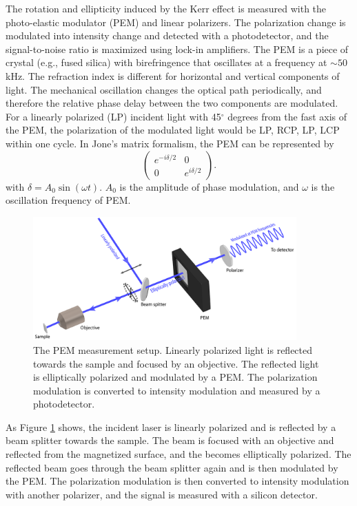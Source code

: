 \documentclass[pdflatex, sectionletters, 12pt]{pittetd}    %
\begin{document}
The rotation and ellipticity induced by the Kerr effect is measured with the photo-elastic modulator (PEM) and linear polarizers. The polarization change is modulated into intensity change and detected with a photodetector, and the signal-to-noise ratio is maximized using lock-in amplifiers. The PEM is a piece of crystal (e.g., fused silica) with birefringence that oscillates at a frequency at $\sim 50$ kHz. The refraction index is different for horizontal and vertical components of light. The mechanical oscillation changes the optical path periodically, and therefore the relative phase delay between the two components are modulated. For a linearly polarized (LP) incident light with 45$^{\circ}$ degrees from the fast axis of the PEM, the polarization of the modulated light would be LP, RCP, LP, LCP within one cycle. In Jone's matrix formalism, the PEM can be represented by
$$
\begin{pmatrix}
e^{-i\delta/2} & 0 \\
0 & e^{i\delta/2}
\end{pmatrix}.
$$ 
with $\delta = A_0 \sin (\omega t)$. $A_0$ is the amplitude of phase modulation, and $\omega$ is the oscillation frequency of PEM.

\begin{figure}[h!]
	\centering
	\includegraphics[width=0.9\textwidth]{Drawing/PEMOptics_small.png}
	\caption{The PEM measurement setup. Linearly polarized light is reflected towards the sample and focused by an objective. The reflected light is elliptically polarized and modulated by a PEM. The polarization modulation is converted to intensity modulation and measured by a photodetector.}
	\label{FIG:PEMOptics}
\end{figure}

As Figure \ref{FIG:PEMOptics} shows, the incident laser is linearly polarized and is reflected by a beam splitter towards the sample. The beam is focused with an objective and reflected from the magnetized surface, and the becomes elliptically polarized. The reflected beam goes through the beam splitter again and is then modulated by the PEM. The polarization modulation is then converted to intensity modulation with another polarizer, and the signal is measured with a silicon detector.
\end{document}
